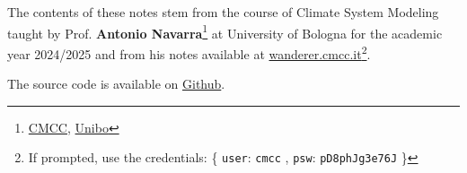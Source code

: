 \documentclass[
    11pt, 
    twoside, 
    english
]{book} %
\begin{document}

\newpage



\vspace*{\fill}
The contents of these notes stem from the course of Climate System Modeling taught by Prof. \textbf{Antonio Navarra}\footnote{\href{https://www.cmcc.it/people/navarra-a}{CMCC}, \href{https://www.unibo.it/sitoweb/antonio.navarra/en}{Unibo}} at University of Bologna for the academic year 2024/2025 and from his notes available at \href{https://wanderer.cmcc.it}{wanderer.cmcc.it}\footnote{
        If prompted, use the credentials: \{ \texttt{user}: \texttt{cmcc}  ,
        \texttt{psw}: \texttt{pD8phJg3e76J} \} }. 

The source code is available on \href{https://github.com/niccolozanotti/climate-modeling/}{Github}.
\vspace*{\fill}

\tableofcontents
\newpage



%
% 
% 

%
%
%
%
%


%
%
%
%
%
%
%
%
%
%
%
%
%
%
%
\end{document}
